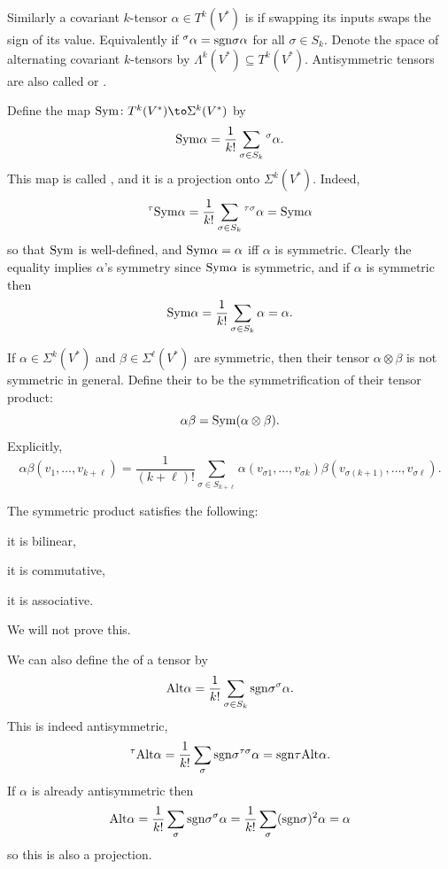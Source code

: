     Similarly a covariant $k$-tensor $\alpha\in T^k(V^*)$ is  if swapping its inputs swaps the sign of its value.
    Equivalently if ${}^\sigma\alpha={\rm sgn}\sigma\alpha$ for all $\sigma\in S_k$.
    Denote the space of alternating covariant $k$-tensors by $\Lambda^k(V^*)\subseteq T^k(V^*)$.
    Antisymmetric tensors are also called  or .

\edefn

Define the map $\sym\colon T^k(V^*)\to\Sigma^k(V^*)$ by
$$ {\rm Sym}\alpha = {{1}\over{k!}}\sum_{\sigma\in S_k}{}^\sigma\alpha . $$
This map is called , and it is a projection onto $\Sigma^k(V^*)$.
Indeed,
$$ {}^\tau{\rm Sym}\alpha = {{1}\over{k!}}\sum_{\sigma\in S_k}{}^{\tau\sigma}\alpha = {\rm Sym}\alpha $$
so that ${\rm Sym}$ is well-defined, and ${\rm Sym}\alpha=\alpha$ iff $\alpha$ is symmetric.
Clearly the equality implies $\alpha$'s symmetry since ${\rm Sym}\alpha$ is symmetric, and if $\alpha$ is symmetric then
$$ {\rm Sym}\alpha = {{1}\over{k!}}\sum_{\sigma\in S_k}\alpha = \alpha . $$

\bdefn

    If $\alpha\in\Sigma^k(V^*)$ and $\beta\in\Sigma^\ell(V^*)$ are symmetric, then their tensor $\alpha\otimes\beta$ is not symmetric in general.
    Define their  to be the symmetrification of their tensor product:
    $$ \alpha\beta = {\rm Sym}(\alpha\otimes\beta) . $$
    Explicitly,
    $$ \alpha\beta(v_1,\dots,v_{k+\ell}) =
    \frac1{(k+\ell)!}\sum_{\sigma\in S_{k+\ell}}\alpha(v_{\sigma1},\dots,v_{\sigma k})\beta(v_{\sigma(k+1)},\dots,v_{\sigma\ell}) . $$

\edefn

\bprop

    The symmetric product satisfies the following:
    \benum
        \item it is bilinear,
        \item it is commutative,
        \item it is associative.
    \eenum

\eprop

We will not prove this.

We can also define the  of a tensor by
$$ {\rm Alt}\alpha = {{1}\over{k!}}\sum_{\sigma\in S_k}{\rm sgn}\sigma{}^\sigma\alpha . $$
This is indeed antisymmetric,
$$ {}^\tau{\rm Alt}\alpha = {{1}\over{k!}}\sum_\sigma{\rm sgn}\sigma{}^{\tau\sigma}\alpha = {\rm sgn}\tau{\rm Alt}\alpha . $$
If $\alpha$ is already antisymmetric then
$$ {\rm Alt}\alpha = {{1}\over{k!}}\sum_\sigma{\rm sgn}\sigma{}^\sigma\alpha = {{1}\over{k!}}\sum_\sigma({\rm sgn}\sigma)^2\alpha = \alpha $$
so this is also a projection.

